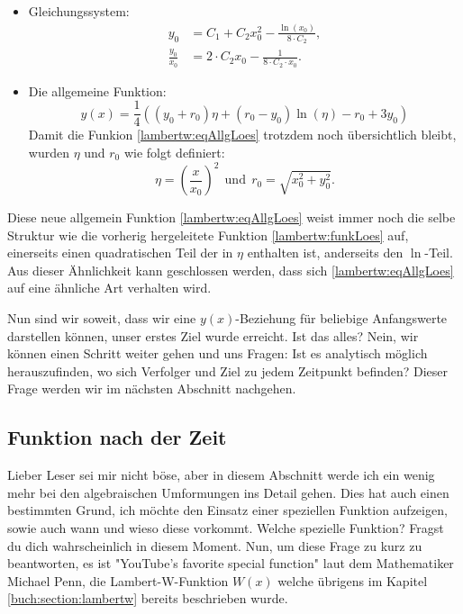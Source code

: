 \begin{itemize}
	\item
	Gleichungssystem:
	\begin{subequations}
		\begin{align}
			y_0
			&=
			C_1 + C_2 x^2_0 - \frac{\operatorname{ln}(x_0)}{8 \cdot C_2}, \\
			\frac{y_0}{x_0}
			&=
			2 \cdot  C_2 x_0 - \frac{1}{8 \cdot C_2 \cdot x_0}.
		\end{align}
		\label{lambertw:eqGleichungssystem}
	\end{subequations}
	\item
	Die allgemeine Funktion:
	\begin{equation}
		y(x)
		=
		\frac{1}{4}\left(\left(y_0+r_0\right)\eta+\left(r_0-y_0\right)\operatorname{ln}\left(\eta\right)-r_0+3y_0\right)
		\label{lambertw:eqAllgLoes}
	\end{equation}
	Damit die Funkion \eqref{lambertw:eqAllgLoes} trotzdem noch übersichtlich bleibt, wurden \(\eta\) und \(r_0\) wie folgt definiert:
	\begin{equation}
		\eta
		=
		\left(\frac{x}{x_0}\right)^2
		\:\:\text{und}\:\:
		r_0
		=
		\sqrt{x_0^2+y_0^2}.
	\end{equation}
\end{itemize}
Diese neue allgemein Funktion \eqref{lambertw:eqAllgLoes} weist immer noch die selbe Struktur wie die vorherig hergeleitete Funktion \eqref{lambertw:funkLoes} auf, einerseits einen quadratischen Teil der in \(\eta\) enthalten ist, anderseits den \(\operatorname{ln}\)-Teil. Aus dieser Ähnlichkeit kann geschlossen werden, dass sich \eqref{lambertw:eqAllgLoes} auf eine ähnliche Art verhalten wird.

Nun sind wir soweit, dass wir eine \(y(x)\)-Beziehung für beliebige Anfangswerte darstellen können, unser erstes Ziel wurde erreicht. Ist das alles? Nein, wir können einen Schritt weiter gehen und uns Fragen: Ist es analytisch möglich herauszufinden, wo sich Verfolger und Ziel zu jedem Zeitpunkt befinden? Dieser Frage werden wir im nächsten Abschnitt nachgehen.

\subsection{Funktion nach der Zeit 
	\label{lambertw:subsection:FunkNachT}}
Lieber Leser sei mir nicht böse, aber in diesem Abschnitt werde ich ein wenig mehr bei den algebraischen Umformungen ins Detail gehen. Dies hat auch einen bestimmten Grund, ich möchte den Einsatz einer speziellen Funktion aufzeigen, sowie auch wann und wieso diese vorkommt. Welche spezielle Funktion? Fragst du dich wahrscheinlich in diesem Moment. Nun, um diese Frage zu kurz zu beantworten, es ist "YouTube's favorite special function" laut dem Mathematiker Michael Penn, die Lambert-W-Funktion \(W(x)\) welche übrigens im Kapitel \ref{buch:section:lambertw} bereits beschrieben wurde.

